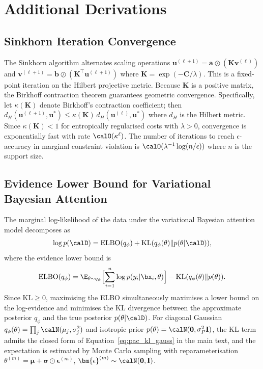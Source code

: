 \section{Additional Derivations}
\label{app:additional}

\subsection{Sinkhorn Iteration Convergence}
\label{app:sinkhorn}

The Sinkhorn algorithm alternates scaling operations $\mathbf{u}^{(\ell+1)}=\mathbf{a}\oslash(\mathbf{K}\mathbf{v}^{(\ell)})$ and $\mathbf{v}^{(\ell+1)}=\mathbf{b}\oslash(\mathbf{K}^\top\mathbf{u}^{(\ell+1)})$ where $\mathbf{K}=\exp(-\mathbf{C}/\lambda)$. This is a fixed-point iteration on the Hilbert projective metric. Because $\mathbf{K}$ is a positive matrix, the Birkhoff contraction theorem guarantees geometric convergence. Specifically, let $\kappa(\mathbf{K})$ denote Birkhoff's contraction coefficient; then $d_H(\mathbf{u}^{(\ell+1)},\mathbf{u}^*)\le\kappa(\mathbf{K})\,d_H(\mathbf{u}^{(\ell)},\mathbf{u}^*)$ where $d_H$ is the Hilbert metric. Since $\kappa(\mathbf{K})<1$ for entropically regularised costs with $\lambda>0$, convergence is exponentially fast with rate $\calO(\kappa^{\ell})$. The number of iterations to reach $\epsilon$-accuracy in marginal constraint violation is $\calO(\lambda^{-1}\log(n/\epsilon))$ where $n$ is the support size.


\subsection{Evidence Lower Bound for Variational Bayesian Attention}
\label{app:elbo}

The marginal log-likelihood of the data under the variational Bayesian attention model decomposes as
\begin{equation}
\log p(\calD) = \mathrm{ELBO}(q_\phi) + \mathrm{KL}(q_\phi(\theta)\|p(\theta|\calD)),
\end{equation}
where the evidence lower bound is
\begin{equation}
\mathrm{ELBO}(q_\phi) = \E_{\theta\sim q_\phi}\Bigl[\sum_{i=1}^n\log p(y_i|\bx_i,\theta)\Bigr] - \mathrm{KL}(q_\phi(\theta)\|p(\theta)).
\end{equation}
Since $\mathrm{KL}\ge 0$, maximising the ELBO simultaneously maximises a lower bound on the log-evidence and minimises the KL divergence between the approximate posterior $q_\phi$ and the true posterior $p(\theta|\calD)$. For diagonal Gaussian $q_\phi(\theta)=\prod_j\calN(\mu_j,\sigma_j^2)$ and isotropic prior $p(\theta)=\calN(\mathbf{0},\sigma_P^2\mathbf{I})$, the KL term admits the closed form of Equation~\eqref{eq:pac_kl_gauss} in the main text, and the expectation is estimated by Monte Carlo sampling with reparameterisation $\theta^{(m)}=\bm{\mu}+\bm{\sigma}\odot\bm{\epsilon}^{(m)}$, $\bm{\epsilon}^{(m)}\sim\calN(\mathbf{0},\mathbf{I})$.


